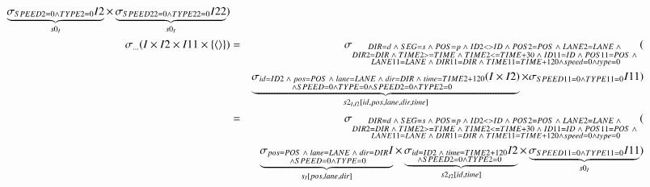 \begin{eqnarray*}
\underbrace{\sigma_{ SPEED2 = 0 \wedge TYPE2 = 0 } I2}_{s0_{I}} \times  
\underbrace{\sigma_{SPEED22 = 0 \wedge TYPE22 =0} I22}_{s0_{I}}) \\
\sigma_{ \dots}(I \times I2 \times I11 \times \{\tuple{} \} )&=&
\sigma_{ \substack{DIR = d \;\wedge\; SEG = s \;\wedge\; POS = p \;\wedge\; ID2 <> ID \;\wedge\; POS2 = POS \;\wedge\; LANE2 = LANE \;\wedge\; \\DIR2 = DIR \;\wedge\; TIME2 >= TIME \;\wedge\; TIME2 <= TIME + 30 \;\wedge\; ID11 = ID \;\wedge\; POS11 = POS \;\wedge\; \\ LANE11 = LANE \;\wedge\; DIR11=DIR \;\wedge\; TIME11 = TIME + 120 \wedge speed = 0 \wedge type =0 }}(\\
&&\underbrace{\sigma_{\substack{ id = ID2 \;\wedge\; pos = POS \;\wedge\;  lane = LANE \;\wedge\; dir = DIR \;\wedge\; time = TIME2 + 120 \\\wedge SPEED = 0 \wedge TYPE = 0 \wedge SPEED2 = 0 \wedge TYPE2 = 0}} (I \times I2)}_{s2_{I, I2}[id, pos, lane, dir, time]} \times 
\sigma_{SPEED11 = 0 \wedge TYPE11 = 0} I11)\\
&=&
\sigma_{ \substack{DIR = d \;\wedge\; SEG = s \;\wedge\; POS = p \;\wedge\; ID2 <> ID \;\wedge\; POS2 = POS \;\wedge\; LANE2 = LANE \;\wedge\; \\DIR2 = DIR \;\wedge\; TIME2 >= TIME \;\wedge\; TIME2 <= TIME + 30 \;\wedge\; ID11 = ID \;\wedge\; POS11 = POS \;\wedge\; \\ LANE11 = LANE \;\wedge\; DIR11=DIR \;\wedge\; TIME11 = TIME + 120 \wedge speed = 0 \wedge type =0 }}(\\
&&\underbrace{\sigma_{\substack{  pos = POS \;\wedge\;  lane = LANE \;\wedge\; dir = DIR \\\wedge SPEED = 0 \wedge TYPE = 0 }} I }_{s_{I}[pos, lane, dir]}\times 
\underbrace{\sigma_{\substack{id = ID2\;\wedge\;time = TIME2 + 120\\ \wedge SPEED2 = 0 \wedge TYPE2 = 0}} I2}_{s2_{I2}[id, time]} \times 
\underbrace{\sigma_{SPEED11 = 0 \wedge TYPE11 = 0} I11}_{s0_{I}})
%
\end{eqnarray*}
\pagebreak

